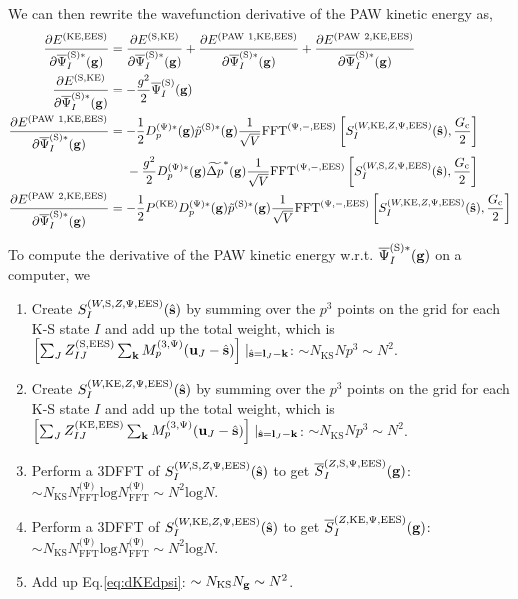 \documentclass[paper=a4, fontsize=11pt]{article} %
\numberwithin{equation}{section} %
\numberwithin{figure}{section} %
\numberwithin{table}{section} %
\newcommand{\p}{\partial}
\newcommand{\wt}{\widetilde}
\newcommand{\ol}{\overline}
\newcommand{\bu}{{\bf{u}}}
\newcommand{\bl}{{\bf{l}}}
\newcommand{\bk}{{\bf{k}}}
\newcommand{\bs}{{\bf{s}}}
\newcommand{\bg}{{\bf{g}}}
\newcommand{\hs}{{\hat{\bf{s}}}}
\newcommand{\rS}{{\mathrm{S}}}
\newcommand{\rKE}{{\mathrm{KE}}}
\newcommand{\rEES}{{\mathrm{EES}}}
\newcommand{\rP}{{\mathrm{PAW}}}
\newcommand{\rl}{{\mathrm{log}}}
\newcommand{\psigs}{{\overline \Psi_I^{(\rS)}(\bg)}}
\newcommand{\psigsc}{{\overline \Psi_I^{(\rS)*}(\bg)}}
\newcommand{\NKS}{{N_{\mathrm{KS}}}}
\newcommand{\NFFTp}{{N^{\mathrm{(\Psi})}_{\mathrm{FFT}}}}
\newcommand{\Gc}{{G_{\mathrm{c}}}}
\newcommand{\Dpgc}{{D^{(\Psi)*}_p(\bg)}}
\newcommand{\Mp}{{M_p^{(3,\Psi)}}}
\newcommand{\FFTpiEES}{{\mathrm{FFT}^{(\Psi,-,\rEES)}}}
\begin{document}
We can then rewrite the wavefunction derivative of the PAW kinetic energy as,
\begin{equation}\label{eq:dKEdpsi}
\begin{split}
\frac{\p E^{(\rKE,\rEES)}}{\p \psigsc} &= \frac{\p E^{(\rS,\rKE)}}{\p \psigsc} + \frac{\p E^{(\rP\ 1,\rKE,\rEES)}}{\p \psigsc} + \frac{\p E^{(\rP\ 2,\rKE,\rEES)}}{\p \psigsc} \\
\frac{\p E^{(\rS,\rKE)}}{\p \psigsc}
& = -\frac{g^2}{2}\psigs \\
\frac{\p E^{(\rP\ 1,\rKE,\rEES)}}{\p \psigsc}
&= -\frac{1}{2} \Dpgc \tilde p^{(\rS)*}(\bg) \frac{1}{\sqrt{V}} \FFTpiEES \left[ S_I^{(W,\rKE,Z,\Psi,\rEES)}(\hs),\frac{\Gc}{2} \right] \\
&\ \ \ \  -\frac{g^2}{2}\Dpgc \wt {\Delta p}^*(\bg)\frac{1}{\sqrt{V}} \FFTpiEES \left[ S_I^{(W,\rS,Z,\Psi,\rEES)}(\hs),\frac{\Gc}{2} \right] \\
\frac{\p E^{(\rP\ 2,\rKE,\rEES)}}{\p \psigsc}
&= -\frac{1}{2} P^{(\rKE)} \Dpgc \tilde p^{(\rS)*}(\bg) \frac{1}{\sqrt{V}} \FFTpiEES \left[ S_I^{(W,\rKE,Z,\Psi,\rEES)}(\hs),\frac{\Gc}{2} \right]\\
\end{split}
\end{equation}

To compute the derivative of the PAW kinetic energy w.r.t. $\psigsc$ on a computer, we
\begin{enumerate}
\item Create $S_I^{(W,\rS,Z,\Psi,\rEES)}(\hs)$ by summing over the $p^3$ points on the grid for each K-S state $I$ and add up the total weight, which is $\left[\sum_J Z_{IJ} ^{(\rS,\rEES)} \sum_{\bk} \Mp(\bu_{J}-\hat \bs) \right]\mid_{\hat \bs = \bl_J-\bk}$: $\sim \NKS N p^3 \sim N^2$.
\item Create $S_I^{(W,\rKE,Z,\Psi,\rEES)}(\hs)$ by summing over the $p^3$ points on the grid for each K-S state $I$ and add up the total weight, which is $\left[\sum_J Z_{IJ} ^{(\rKE,\rEES)} \sum_{\bk} \Mp(\bu_{J}-\hat \bs) \right]\mid_{\hat \bs = \bl_J-\bk}$: $\sim \NKS N p^3 \sim N^2$.
\item Perform a 3DFFT of $S_I^{(W,\rS,Z,\Psi,\rEES)}(\hs)$ to get $\ol S_I^{(Z,\rS,\Psi,\rEES)}(\bg)$: $\sim \NKS \NFFTp \rl \NFFTp \sim N^2 \rl N$.
\item Perform a 3DFFT of $S_I^{(W,\rKE,Z,\Psi,\rEES)}(\hs)$ to get $\ol S_I^{(Z,\rKE,\Psi,\rEES)}(\bg)$: $\sim \NKS \NFFTp \rl \NFFTp \sim N^2 \rl N$.
\item Add up Eq.\eqref{eq:dKEdpsi}: $\sim \NKS N_\bg \sim N^2$.
\end{enumerate}
\end{document}
